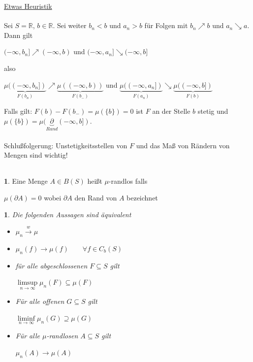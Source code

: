 \documentclass[10pt,a4paper]{report}
\newcommand{\R}{\mathbb{R}}
\numberwithin{equation}{section}
\numberwithin{figure}{section}
\theoremstyle{plain}
\theoremstyle{definition}
\newtheorem{defn}{\protect\definitionname}[section]
\theoremstyle{plain}
\newtheorem{prop}{\protect\propositionname}[section]
\theoremstyle{definition}
\theoremstyle{remark}
\theoremstyle{plain}
\theoremstyle{plain}
\theoremstyle{plain}
\theoremstyle{plain}
\theoremstyle{plain}
\providecommand{\definitionname}{Definition}
\providecommand{\propositionname}{Satz}
\newcommand{\1}{ \mathbb{1} } %
\begin{document}
\underline{Etwas Heuristik}\\\\
Sei $S=\R$, $b \in \R$. Sei weiter $b_n <b$ und $a_n>b$ für Folgen mit $b_n\nearrow b$ und $a_n \searrow a$. Dann gilt
\begin{center}
$(-\infty,b_n] \nearrow (-\infty,b)$ und $(-\infty,a_n] \searrow (-\infty,b]$
\end{center}
also 
\begin{center}
$\underbrace{\mu((-\infty,b_n])}_{F(b_n)} \nearrow \underbrace{\mu((-\infty,b))}_{F(b_-)}$ und $\underbrace{\mu((-\infty,a_n])}_{F(a_n)} \searrow \underbrace{\mu((-\infty,b])}_{F(b)}$
\end{center}
Falls gilt: $F(b)-F(b_-)=\mu(\{b\})=0$ ist $F$ an der Stelle $b$ stetig und $\mu(\{b\})=\mu(\underbrace{\partial}_{Rand}(-\infty,b])$.\\\\
Schlußfolgerung: Unstetigkeitsstellen von $F$ und das Maß von Rändern von Mengen sind wichtig!\\\\
\begin{defn}
  Eine Menge $A \in B(S)$ heißt $\mu$-randlos falls
  \begin{center}
    $\mu(\partial A)=0$ wobei $\partial A$ den Rand von $A$ bezeichnet
  \end{center}
\end{defn}
\begin{prop}
  Die folgenden Aussagen sind äquivalent
  \begin{itemize}
  \item[1)] $\mu_n \overset{w}{\to} \mu$
  \item[2)] $\mu_n(f) \to \mu(f) \qquad \forall f \in C_b(S)$
  \item[3)] für alle abgeschlossenen $F \subseteq S$ gilt
    \begin{center}
      $\limsup\limits_{n \to \infty} \mu_n(F) \subseteq \mu(F)$
    \end{center}
  \item[4)] Für alle offenen $G \subseteq S$ gilt
    \begin{center}
      $\liminf\limits_{n \to \infty}\mu_n(G) \supseteq \mu(G)$
    \end{center}
  \item[5)] Für alle $\mu$-randlosen $A \subseteq S$ gilt
    \begin{center}
      $\mu_n(A) \to \mu(A)$
    \end{center}
  \end{itemize}
\end{prop}
\end{document}
